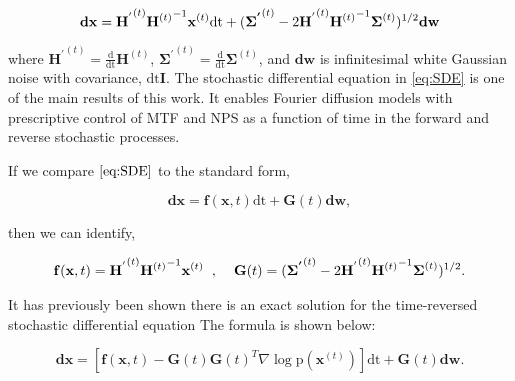 \documentclass[12pt,]{article}
\begin{document}
\begin{equation}
    \mathbf{dx} = \mathbf{H^{'}}^{(t)}{\mathbf{H}^{(t)}}^{\hspace{0mm}-1} \mathbf{x}^{(t)} \text{dt} + (\boldsymbol{\Sigma^{'}}^{(t)}  -  2 {\mathbf{H^{'}}^{(t)}} {\mathbf{H}^{(t)}}^{\hspace{0mm}-1}  \boldsymbol{\Sigma}^{(t)} )^{1/2} \mathbf{dw} \label{eq:SDE}
\end{equation}

\noindent where $\mathbf{H^{'}}^{(t)} = \frac{\text{d}}{\text{dt}} \mathbf{H}^{(t)} $,  $\boldsymbol{\Sigma^{'}}^{(t)} = \frac{\text{d}}{\text{dt}} \boldsymbol{\Sigma}^{(t)}$, and $\mathbf{dw}$ is infinitesimal white Gaussian noise with covariance, $\text{dt} \mathbf{I}$. The stochastic differential equation in \eqref{eq:SDE} is one of the main results of this work. It enables Fourier diffusion models with prescriptive control of MTF and NPS as a function of time in the forward and reverse stochastic processes. 

If we compare $\eqref{eq:SDE}$ to the standard form, 

\begin{equation}
    \mathbf{dx} = \mathbf{f}(\mathbf{x}, t) \text{dt} + \mathbf{G}(t) \mathbf{dw},
\end{equation}

\noindent then we can identify,

\begin{gather}
    \mathbf{f}(\mathbf{x}, t) = \mathbf{H^{'}}^{(t)}{\mathbf{H}^{(t)}}^{\hspace{0mm}-1} \mathbf{x}^{(t)} \hspace{2mm},\hspace{4mm} 
    \mathbf{G}(t) = (\boldsymbol{\Sigma^{'}}^{(t)}  -  2 {\mathbf{H^{'}}^{(t)}} {\mathbf{H}^{(t)}}^{\hspace{0mm}-1}  \boldsymbol{\Sigma}^{(t)} )^{1/2} .
    \label{eq:f_g}
\end{gather}

It has previously been shown there is an exact solution for the time-reversed stochastic differential equation \cite{anderson1982reverse}\cite{song2020score} The formula is shown below:

\begin{equation}
    \mathbf{dx} = [\mathbf{f}(\mathbf{x}, t) - \mathbf{G}(t) {\mathbf{G}(t)}^T \nabla \log{\text{p} (\mathbf{x}^{(t)})}] \text{dt} + \mathbf{G}(t) \mathbf{dw}.
    \label{eq:reverse_sde_standard_form}
\end{equation}
\end{document}
